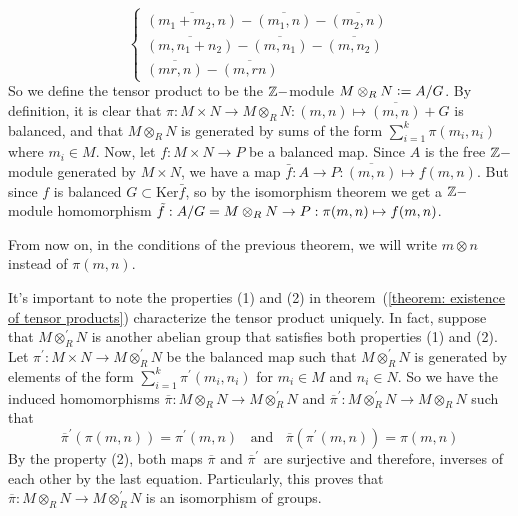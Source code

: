 \begin{equation}
\left\{\begin{matrix}
    \overline{(m_1+m_2,n)}-\overline{(m_1,n)}-\overline{(m_2,n)}\\
    \overline{(m,n_1+n_2)}-\overline{(m,n_1)}-\overline{(m,n_2)}\\
    \overline{(mr,n)}-\overline{(m,rn)}
\end{matrix}\right.
\end{equation}
So we define the tensor product to be the $\mathbb{Z}-$module $M\otimes_R N \bydef A/G$. By definition, it is clear that $\pi:M\times N\rightarrow M\otimes_R N:(m,n)\mapsto \overline{(m,n)}+G$ is balanced, and that $M\otimes_R N$ is generated by sums of the form $\sum_{i=1}^k\pi(m_i,n_i)$ where $m_i\in M$. Now, let $f:M\times N\rightarrow P$ be a balanced map. Since $A$ is the free $\mathbb{Z}-$module generated by $M\times N$, we have a map $\bar{f}: A\rightarrow P:\overline{(m,n)}\mapsto f(m,n)$. But since $f$ is balanced $G\subset \text{Ker}\bar{f}$, so by the isomorphism theorem we get a $\mathbb{Z}-$module homomorphism $\Tilde{f}: A/G=M\otimes_R N\rightarrow P: \pi(m,n)\mapsto f(m,n)$.
\begin{dang}
\begin{notation}
    From now on, in the conditions of the previous theorem, we will write $m\otimes n$ instead of $\pi(m,n)$.
\end{notation}
\end{dang}
It's important to note the properties (1) and (2) in theorem~(\ref{theorem: existence of tensor products}) characterize the tensor product uniquely. In fact, suppose that $M\otimes_R^\prime N$ is another abelian group that satisfies both properties (1) and (2). Let $\pi^\prime:M\times N\rightarrow M\otimes_R^\prime N$ be the balanced map such that $M\otimes_R^\prime N$ is generated by elements of the form $\sum_{i=1}^k\pi^\prime(m_i,n_i)$ for $m_i\in M$ and $n_i\in N$. So we have the induced homomorphisms $\overline{\pi}: M\otimes_RN\rightarrow M\otimes_R^\prime N$ and $\overline{\pi}^\prime:M\otimes_R^\prime N\rightarrow M\otimes_RN$ such that 
\begin{equation}
    \overline{\pi}^\prime(\pi(m,n))=\pi^\prime(m,n)\;\;\text{ and }\;\;\overline{\pi}(\pi^\prime(m,n))=\pi(m,n)
\end{equation}
By the property (2), both maps $\overline{\pi}$ and $\overline{\pi}^\prime$ are surjective and therefore, inverses of each other by the last equation. Particularly, this proves that $\overline{\pi}: M\otimes_RN\rightarrow M\otimes_R^\prime N$ is an isomorphism of groups.
